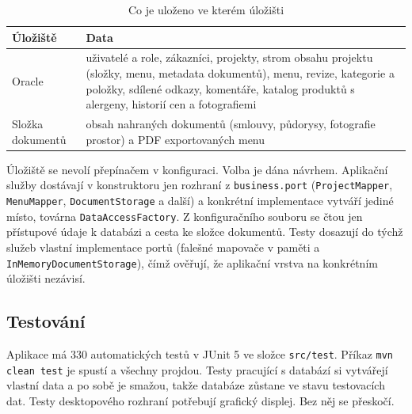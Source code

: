 \begin{table}[H]
  \centering
  \small
  \caption{Co je uloženo ve kterém úložišti}\label{tab:impl:storage}
  \begin{tabularx}{\textwidth}{@{}lX@{}}
    \toprule
    Úložiště & Data \\
    \midrule
    Oracle & uživatelé a role, zákazníci, projekty, strom obsahu projektu (složky, menu, metadata dokumentů), menu, revize, kategorie a položky, sdílené odkazy, komentáře, katalog produktů s alergeny, historií cen a fotografiemi \\
    Složka dokumentů & obsah nahraných dokumentů (smlouvy, půdorysy, fotografie prostor) a PDF exportovaných menu \\
    \bottomrule
  \end{tabularx}
\end{table}

Úložiště se nevolí přepínačem v konfiguraci. Volba je dána návrhem. Aplikační služby dostávají v konstruktoru jen rozhraní z \texttt{business.port} (\texttt{ProjectMapper}, \texttt{MenuMapper}, \texttt{DocumentStorage} a další) a konkrétní implementace vytváří jediné místo, továrna \texttt{DataAccessFactory}. Z konfiguračního souboru se čtou jen přístupové údaje k databázi a cesta ke složce dokumentů. Testy dosazují do týchž služeb vlastní implementace portů (falešné mapovače v paměti a \texttt{InMemoryDocumentStorage}), čímž ověřují, že aplikační vrstva na konkrétním úložišti nezávisí.

\subsection{Testování}\label{sec:impl:test}

Aplikace má 330 automatických testů v JUnit 5 ve složce \texttt{src/test}. Příkaz \texttt{mvn clean test} je spustí a všechny projdou. Testy pracující s databází si vytvářejí vlastní data a po sobě je smažou, takže databáze zůstane ve stavu testovacích dat. Testy desktopového rozhraní potřebují grafický displej. Bez něj se přeskočí.

